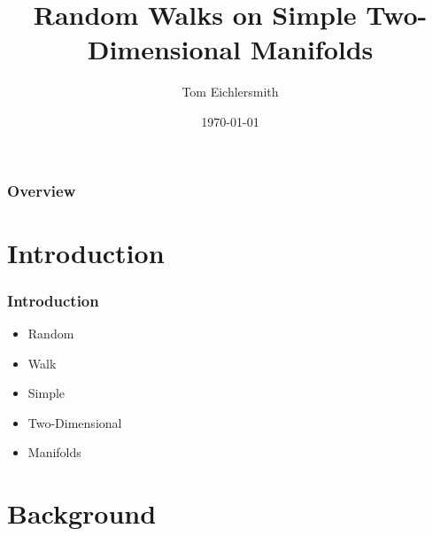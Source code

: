 \documentclass{beamer}
\title[Random Walks]{Random Walks on Simple Two-Dimensional Manifolds} %
\author{Tom Eichlersmith}
\institute[Hamline U]
{
Hamline University \\
\medskip
\texttt{teichlersmith01@hamline.edu}
}
\date{\today}
\begin{document}
\begin{frame}
\titlepage %
\end{frame}

\begin{frame}
\frametitle{Overview} %
\tableofcontents %
\end{frame}


\section{Introduction} 

\begin{frame}

\frametitle{Introduction}

\begin{itemize}
	\item Random
	\item Walk
	\item Simple
	\item Two-Dimensional
	\item Manifolds
\end{itemize}

\end{frame}

\section{Background}
\end{document}
